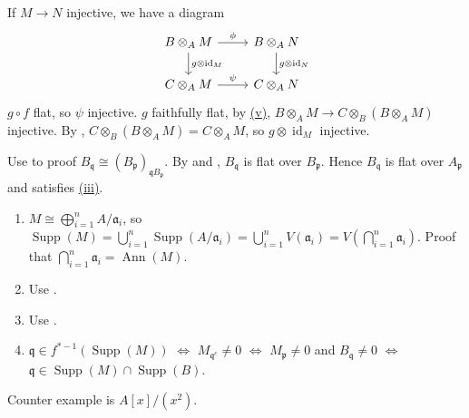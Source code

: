 \begin{exercise}\label{ex3.17}
	If $M\rightarrow N$ injective, we have a diagram
	\begin{equation*}
		\begin{tikzcd}
			B\otimes_AM\arrow[r,"\phi"]\arrow[d,"g\otimes\operatorname{id}_M"]&B\otimes_AN\arrow[d,"g\otimes\operatorname{id}_N"]\\
			C\otimes_AM\arrow[r,"\psi"]&C\otimes_AN
		\end{tikzcd}
	\end{equation*}
	$g\circ f$ flat, so $\psi$ injective. $g$ faithfully flat, by \hyperref[ex3.16]{(v)}, $B\otimes_AM\rightarrow C\otimes_B\left(B\otimes_AM\right)$ injective. By , $C\otimes_B\left(B\otimes_AM\right)=C\otimes_AM$, so $g\otimes\operatorname{id}_M$ injective.
\end{exercise}

\begin{exercise}\label{ex3.18}
	Use  to proof $B_\mathfrak{q}\cong\left(B_\mathfrak{p}\right)_{\mathfrak{q}B_\mathfrak{p}}$. By  and , $B_\mathfrak{q}$ is flat over $B_\mathfrak{p}$. Hence $B_\mathfrak{q}$ is flat over $A_\mathfrak{p}$ and satisfies \hyperref[ex3.16]{(iii)}.
\end{exercise}

\begin{exercise}\label{ex3.19}
	\begin{enumerate}[label=\textup{(\roman*)},ref=\theexercise(\roman*)]
		\addtocounter{enumi}{4}
		\item\label{ex3.19.5} $M\cong\bigoplus_{i=1}^nA/\mathfrak{a}_i$, so $\operatorname{Supp}(M)=\bigcup_{i=1}^n\operatorname{Supp}\left(A/\mathfrak{a}_i\right)=\bigcup_{i=1}^nV(\mathfrak{a}_i)=V\left(\bigcap_{i=1}^n\mathfrak{a}_i\right)$. Proof that $\bigcap_{i=1}^n\mathfrak{a}_i=\operatorname{Ann}(M)$.
		\item Use .
		\item Use .
		\item $\mathfrak{q}\in f^{*-1}\left(\operatorname{Supp}(M)\right)$ $\Leftrightarrow$ $M_{\mathfrak{q}^c}\neq0$ $\Leftrightarrow$ $M_{\mathfrak{p}}\neq0$ and $B_\mathfrak{q}\neq0$ $\Leftrightarrow$ $\mathfrak{q}\in\operatorname{Supp}(M)\cap\operatorname{Supp}(B)$.
	\end{enumerate}
\end{exercise}

\begin{exercise}\label{ex3.20}
	Counter example is $A[x]/\left(x^2\right)$.
\end{exercise}

